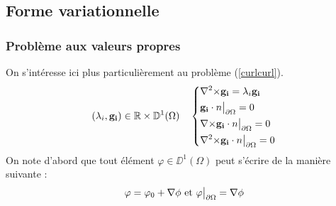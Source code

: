 \subsection{Forme variationnelle}
\label{fv}
\subsubsection{Problème aux valeurs propres}
\label{eigen}

On s'intéresse ici plus particulièrement au problème (\ref{curlcurl}).
\begin{equation}
\label{pbeigen}
(\lambda_i,\mathbf{g_i})\in{\mathbb{R}}\times {\mathbb{D}}^1(\Omega)\quad \left\{
\begin{aligned}
&{\nabla^2\times}  \mathbf{g_i} = \lambda_i \mathbf{g_i}\\
&\mathbf{g_i}\cdot n{\big\rvert_{\partial\Omega}} = 0\\
&{\nabla\times} \mathbf{g_i}\cdot n{\big\rvert_{\partial\Omega}} = 0\\
&{\nabla^2\times}  \mathbf{g_i}\cdot n{\big\rvert_{\partial\Omega}} = 0
\end{aligned}
\right.
\end{equation}
On note d'abord que tout élément $\varphi\in \DD^1(\Omega)$ peut s'écrire de la manière suivante :
\[
\varphi = \varphi_0 + {\nabla}\phi\text{ et } \varphi{\big\rvert_{\partial\Omega}} = {\nabla}\phi
\]

